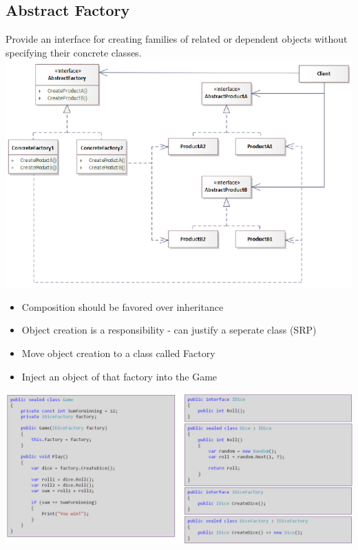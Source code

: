 \subsection{Abstract Factory}
Provide an interface for creating families of related or dependent objects without specifying their concrete classes.\\
\includegraphics[width=\linewidth]{../img/abstract_factory.png}
\begin{itemize}
    \item Composition should be favored over inheritance
    \item Object creation is a responsibility - can justify a seperate class (SRP)
    \item Move object creation to a class called Factory
    \item Inject an object of that factory into the Game
\end{itemize}
\includegraphics[width=\linewidth]{../img/abstract_factory_code.pong.png}

